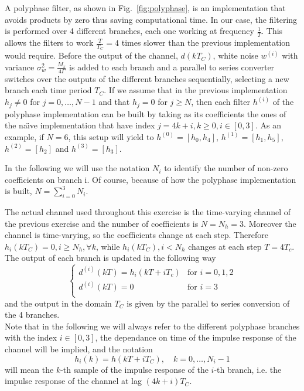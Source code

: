 \documentclass[10pt]{article}
\begin{document}
A polyphase filter, as shown in Fig.~\ref{fig:polyphase}, is an implementation that avoids products by zero thus saving computational time. In our case, the filtering is performed over 4 different branches, each one working at frequency $\frac{1}{T}$. This allows the filters to work $\frac{T}{T_C} = 4$ times slower than the previous implementation would require. Before the output of the channel, $d(kT_C)$, white noise $w^{(i)}$ with variance $\sigma^2_w = \frac{M_x}{4\Gamma}$ is added to each branch and a parallel to series converter switches over the outputs of the different branches sequentially, selecting a new branch each time period $T_C$. If we assume that in the previous implementation $h_j \ne 0$ for $j = 0, \dots, N - 1$ and that $h_j = 0$ for $j \ge N$,
then each filter $h^{(i)}$ of the polyphase implementation can be built by taking as its coefficients the ones of the na\"{\i}ve implementation that have index $j = 4k + i, k \ge 0, i \in [0,3]$.
As an example, if $N = 6$, this setup will yield to $h^{(0)} = [h_0, h_4]$, $h^{(1)} = [h_1, h_5]$, $h^{(2)} = [h_2]$ and $h^{(3)} = [h_3]$.

In the following we will use the notation $N_i$ to identify the number of non-zero coefficients on branch i. Of course, because of how the polyphase implementation is built, $N = \sum_{i = 0}^{3} N_i$.

The actual channel used throughout this exercise is the time-varying channel of the previous exercise and the number of coefficients is $N = N_h = 3$. Moreover the channel is time-varying, so the coefficients change at each step. Therefore $h_i(kT_C) = 0, i \ge N_h, \forall k$, while $h_i(kT_C), i < N_h$ changes at each step $T = 4T_c$. The output of each branch is updated in the following way
\begin{equation}
  \begin{cases}
  d^{(i)}(kT) = h_i(kT + iT_c) & \mbox{for } i = 0, 1, 2 \\
  d^{(i)}(kT) = 0              & \mbox{for } i = 3 \\
  \end{cases}
\end{equation}
and the output in the domain $T_C$ is given by the parallel to series conversion of the 4 branches. \\
Note that in the following we will always refer to the different polyphase branches with the index $i \in [0,3]$, the dependance on time of the impulse response of the channel will be implied, and the notation
\begin{equation}\label{eq:def_ir_branch}
h_i(k) = h(kT+iT_C), \quad k=0,\ldots,N_i-1
\end{equation}
will mean the $k$-th sample of the impulse response of the $i$-th branch, i.e. the impulse response of the channel at lag $(4k+i)T_C$.
\end{document}
